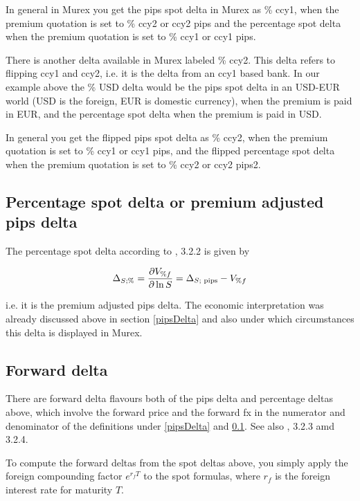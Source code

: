 \documentclass{amsart}
\theoremstyle{plain}
\numberwithin{equation}{section}
\begin{document}
In general in Murex you get the pips spot delta in Murex as \% ccy1, when the premium quotation is set
to \% ccy2 or ccy2 pips and the percentage spot delta when the premium quotation is set to \% ccy1
or ccy1 pips.

There is another delta available in Murex labeled \% ccy2. This delta refers to flipping ccy1 and ccy2,
i.e. it is the delta from an ccy1 based bank. In our example above the \% USD delta would be the pips
spot delta in an USD-EUR world (USD is the foreign, EUR is domestic currency), when the premium is paid
in EUR, and the percentage spot delta when the premium is paid in USD.

In general you get the flipped pips spot delta as \% ccy2, when the premium quotation is set to \% ccy1
or ccy1 pips, and the flipped percentage spot delta when the premium quotation is set to \% ccy2 or
ccy2 pips2.


\subsection{Percentage spot delta or premium adjusted pips delta}
\label{percDelta}

The percentage spot delta according to \cite{Clark}, 3.2.2 is given by

\begin{equation}
\Delta_{S; \%} = \frac{\partial V_{\%f}}{\partial \ln S} = \Delta_{S\textnormal{; pips}} - V_{\% f}
\end{equation}

i.e. it is the premium adjusted pips delta. The economic interpretation was already discussed above
in section \ref{pipsDelta} and also under which circumstances this delta is displayed in Murex.

\subsection{Forward delta}

There are forward delta flavours both of the pips delta and percentage deltas above, which involve
the forward price and the forward fx in the numerator and denominator of the definitions under
\ref{pipsDelta} and \ref{percDelta}. See also \cite{Clark}, 3.2.3 amd 3.2.4.

To compute the forward deltas from the spot deltas above, you simply apply the foreign compounding
factor $e^{r_fT}$ to the spot formulas, where $r_f$ is the foreign interest rate for maturity $T$.
\end{document}
